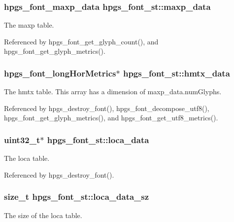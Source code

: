 \subsubsection[maxp\_\-data]{\setlength{\rightskip}{0pt plus 5cm}hpgs\_\-font\_\-maxp\_\-data {\bf hpgs\_\-font\_\-st::maxp\_\-data}}\label{structhpgs__font__st_84b6da5894685a0b4f1732b6bfb96a9f}


The maxp table. 

Referenced by hpgs\_\-font\_\-get\_\-glyph\_\-count(), and hpgs\_\-font\_\-get\_\-glyph\_\-metrics().
\subsubsection[hmtx\_\-data]{\setlength{\rightskip}{0pt plus 5cm}hpgs\_\-font\_\-longHorMetrics$\ast$ {\bf hpgs\_\-font\_\-st::hmtx\_\-data}}\label{structhpgs__font__st_8ac77bb0e5f432ed7e32e994aac4dc6d}


The hmtx table. This array has a dimension of maxp\_\-data.numGlyphs. 

Referenced by hpgs\_\-destroy\_\-font(), hpgs\_\-font\_\-decompose\_\-utf8(), hpgs\_\-font\_\-get\_\-glyph\_\-metrics(), and hpgs\_\-font\_\-get\_\-utf8\_\-metrics().
\subsubsection[loca\_\-data]{\setlength{\rightskip}{0pt plus 5cm}uint32\_\-t$\ast$ {\bf hpgs\_\-font\_\-st::loca\_\-data}}\label{structhpgs__font__st_cfa1cbe2a0f6c6b03fd04ceb088838d7}


The loca table. 

Referenced by hpgs\_\-destroy\_\-font().
\subsubsection[loca\_\-data\_\-sz]{\setlength{\rightskip}{0pt plus 5cm}size\_\-t {\bf hpgs\_\-font\_\-st::loca\_\-data\_\-sz}}\label{structhpgs__font__st_96a6c25b2363f35b7debfa0eb30c6ce1}


The size of the loca table. 
